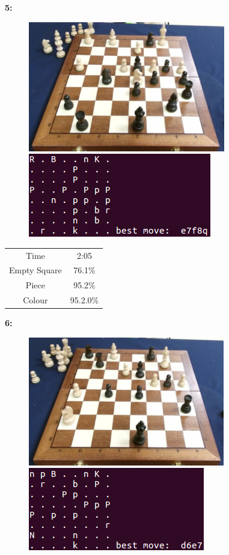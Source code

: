 \documentclass{l4proj}
\begin{document}
\begin{appendices}
\pagebreak
\textbf{5:}
\begin{figure}[h!]
\includegraphics[scale=0.8]{ts/ts8.png} \includegraphics[scale=0.75]{ts/tsd8.png}
\label{ts8}
\end{figure}

\begin{table}[h!]
\centering
\begin{tabular}{|c|c|}
	\hline
	Time & 2:05 \\
	\rowcolor{brown!45}Empty Square & 76.1\%  \\
	Piece & 95.2\% \\
	\rowcolor{brown!45} Colour & 95.2.0\% \\
	\hline
\end{tabular}
\end{table}

\textbf{6:}
\begin{figure}[h!]
\includegraphics[scale=0.8]{ts/ts11.png} \includegraphics[scale=0.75]{ts/tsd11.png}
\label{ts11}
\end{figure}


\end{appendices}
\end{document}
